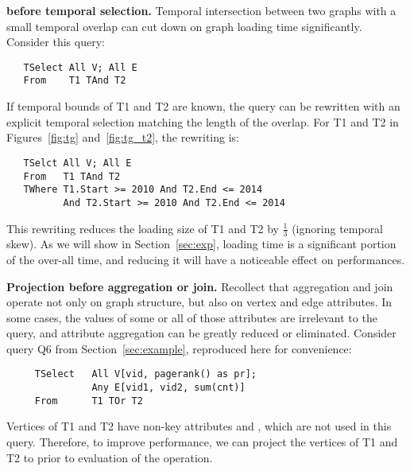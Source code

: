 {\bf {} before temporal selection.}  Temporal intersection
between two graphs with a small temporal overlap can cut down on graph
loading time significantly.  Consider this query:

\begin{small}
\begin{verbatim}
   TSelect All V; All E
   From    T1 TAnd T2
\end{verbatim}
\end{small}

If temporal bounds of T1 and T2 are known, the query can be rewritten
with an explicit temporal selection matching the length of the
overlap.  For T1 and T2 in Figures~\ref{fig:tg} and~\ref{fig:tg_t2},
the rewriting is:

\begin{small}
\begin{verbatim}
   TSelct All V; All E
   From   T1 TAnd T2
   TWhere T1.Start >= 2010 And T2.End <= 2014 
          And T2.Start >= 2010 And T2.End <= 2014
\end{verbatim}
\end{small}

This rewriting reduces the loading size of T1 and T2 by $\frac{1}{3}$
(ignoring temporal skew).  As we will show in Section~\ref{sec:exp},
loading time is a significant portion of the over-all time, and
reducing it will have a noticeable effect on performances.

{\bf Projection before aggregation or join.}  Recollect that
aggregation and join operate not only on graph structure, but also on
vertex and edge attributes.  In some cases, the values of some or all
of those attributes are irrelevant to the query, and attribute
aggregation can be greatly reduced or eliminated.  Consider query Q6
from Section~\ref{sec:example}, reproduced here for convenience:

\begin{small}
\begin{verbatim}
     TSelect   All V[vid, pagerank() as pr]; 
               Any E[vid1, vid2, sum(cnt)]
     From      T1 TOr T2
\end{verbatim}
\end{small}

Vertices of T1 and T2 have non-key attributes  and
, which are not used in this query. Therefore, to
improve performance, we can project the vertices of T1 and T2 to
 prior to evaluation of the  operation.

